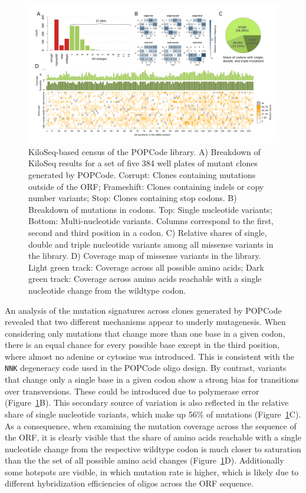 \begin{landscape}
\begin{figure}[h]
	\centering
	\includegraphics[width=9in]{img/popcode_census.pdf}
	\caption{KiloSeq-based census of the  POPCode library. A) Breakdown of KiloSeq results for a set of five 384 well plates of mutant clones generated by POPCode. Corrupt: Clones containing mutations outside of the ORF; Frameshift: Clones containing indels or copy number variants; Stop: Clones containing stop codons. B) Breakdown of mutations in codons. Top: Single nucleotide variants; Bottom: Multi-nucleotide variants. Columns correspond to the first, second and third position in a codon. C) Relative shares of single, double and triple nucleotide variants among all missense variants in the library. D) Coverage map of missense variants in the library. Light green track: Coverage across all possible amino acids; Dark green track: Coverage across amino acids reachable with a single nucleotide change from the wildtype codon.}
	\label{fig:popcode_census}
\end{figure}
\end{landscape}

An analysis of the mutation signatures across clones generated by POPCode revealed that two different mechanisms appear to underly mutagenesis. When considering only mutations that change more than one base in a given codon, there is an equal chance for every possible base except in the third position, where almost no adenine or cytosine was introduced. This is consistent with the \texttt{NNK} degeneracy code used in the POPCode oligo design. By contrast, variants that change only a single base in a given codon show a strong bias for transitions over transversions. These could be introduced due to polymerase error (Figure~\ref{fig:popcode_census}B). This secondary source of variation is also reflected in the relative share of single nucleotide variants, which make up 56\% of mutations (Figure~\ref{fig:popcode_census}C). As a consequence, when examining the mutation coverage across the sequence of the ORF, it is clearly visible that the share of amino acids reachable with a single nucleotide change from the respective wildtype codon is much closer to saturation than the the set of all possible amino acid changes (Figure~\ref{fig:popcode_census}D). Additionally some hotspots are visible, in which mutation rate is higher, which is likely due to different hybridization efficiencies of oligos across the ORF sequence.

